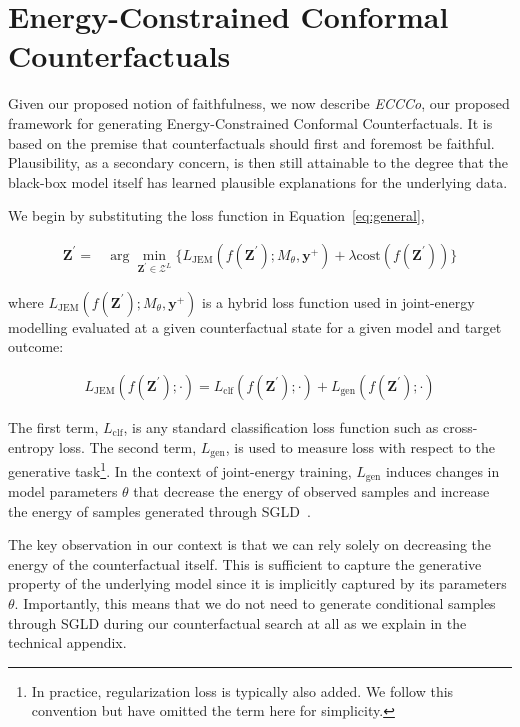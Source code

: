 \section{Energy-Constrained Conformal Counterfactuals}\label{meth}

Given our proposed notion of faithfulness, we now describe \textit{ECCCo}, our proposed framework for generating Energy-Constrained Conformal Counterfactuals. It is based on the premise that counterfactuals should first and foremost be faithful. Plausibility, as a secondary concern, is then still attainable to the degree that the black-box model itself has learned plausible explanations for the underlying data. 

We begin by substituting the loss function in Equation~\ref{eq:general},

\begin{equation} \label{eq:eccco-start}
  \begin{aligned}
  \mathbf{Z}^\prime =& \arg \min_{\mathbf{Z}^\prime \in \mathcal{Z}^L} \{  {L_{\text{JEM}}(f(\mathbf{Z}^\prime);M_{\theta},\mathbf{y}^+)}+ \lambda {\text{cost}(f(\mathbf{Z}^\prime)) } \} 
  \end{aligned} 
\end{equation}

where $L_{\text{JEM}}(f(\mathbf{Z}^\prime);M_{\theta},\mathbf{y}^+)$ is a hybrid loss function used in joint-energy modelling evaluated at a given counterfactual state for a given model and target outcome:

\begin{equation}
  \begin{aligned}
    L_{\text{JEM}}(f(\mathbf{Z}^\prime); \cdot) = L_{\text{clf}}(f(\mathbf{Z}^\prime); \cdot) + L_{\text{gen}}(f(\mathbf{Z}^\prime); \cdot)
  \end{aligned}
\end{equation}

The first term, $L_{\text{clf}}$, is any standard classification loss function such as cross-entropy loss. The second term, $L_{\text{gen}}$, is used to measure loss with respect to the generative task\footnote{In practice, regularization loss is typically also added. We follow this convention but have omitted the term here for simplicity.}. In the context of joint-energy training, $L_{\text{gen}}$ induces changes in model parameters $\theta$ that decrease the energy of observed samples and increase the energy of samples generated through SGLD~\citep{du2019implicit}. 

The key observation in our context is that we can rely solely on decreasing the energy of the counterfactual itself. This is sufficient to capture the generative property of the underlying model since it is implicitly captured by its parameters $\theta$. Importantly, this means that we do not need to generate conditional samples through SGLD during our counterfactual search at all as we explain in the technical appendix.

